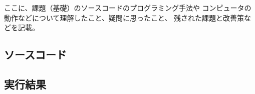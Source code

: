 \documentclass[a4paper,12pt]{jsarticle}
\begin{document}
ここに、課題（基礎）のソースコードのプログラミング手法や
コンピュータの動作などについて理解したこと、疑問に思ったこと、
残された課題と改善策などを記載。

\subsection*{ソースコード}

%

\subsection*{実行結果}

%
\end{document}
